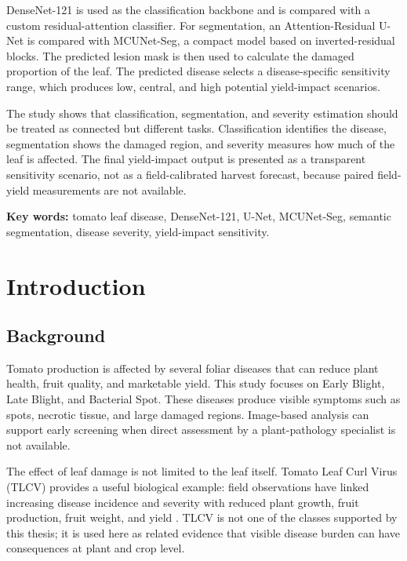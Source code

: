 \documentclass[12pt,a4paper]{article}
\begin{document}
DenseNet-121 is used as the classification backbone and is compared with a custom
residual-attention classifier. For segmentation, an Attention-Residual U-Net is compared
with MCUNet-Seg, a compact model based on inverted-residual blocks. The predicted lesion
mask is then used to calculate the damaged proportion of the leaf. The predicted disease
selects a disease-specific sensitivity range, which produces low, central, and high
potential yield-impact scenarios.

The study shows that classification, segmentation, and severity estimation should be
treated as connected but different tasks. Classification identifies the disease,
segmentation shows the damaged region, and severity measures how much of the leaf is
affected. The final yield-impact output is presented as a transparent sensitivity scenario,
not as a field-calibrated harvest forecast, because paired field-yield measurements are not
available.

\noindent\textbf{Key words:} tomato leaf disease, DenseNet-121, U-Net, MCUNet-Seg,
semantic segmentation, disease severity, yield-impact sensitivity.

\clearpage
{}
\setcounter{page}{1}
\pagestyle{fancy}

\section{Introduction}

\subsection{Background}
Tomato production is affected by several foliar diseases that can reduce plant health,
fruit quality, and marketable yield. This study focuses on Early Blight, Late Blight, and
Bacterial Spot. These diseases produce visible symptoms such as spots, necrotic tissue,
and large damaged regions. Image-based analysis can support early screening when direct
assessment by a plant-pathology specialist is not available.

The effect of leaf damage is not limited to the leaf itself. Tomato Leaf Curl Virus (TLCV)
provides a useful biological example: field observations have linked increasing disease
incidence and severity with reduced plant growth, fruit production, fruit weight, and yield
\cite{iftikhar2021tlcv}. TLCV is not one of the classes supported by this thesis; it is used
here as related evidence that visible disease burden can have consequences at plant and
crop level.
\end{document}
